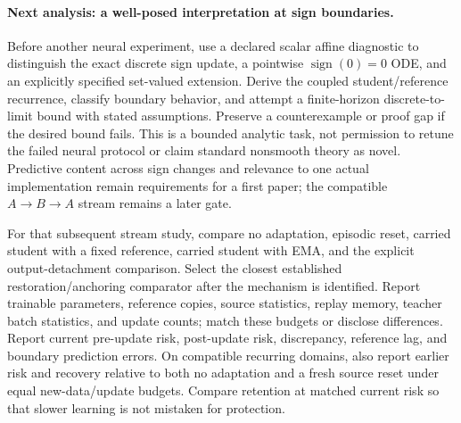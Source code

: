 \documentclass[11pt,a4paper]{article}
\begin{document}
\paragraph{Next analysis: a well-posed interpretation at sign boundaries.}
Before another neural experiment, use a declared scalar affine diagnostic
to distinguish the exact discrete sign update, a pointwise
$\operatorname{sign}(0)=0$ ODE, and an explicitly specified set-valued
extension. Derive the coupled student/reference recurrence, classify
boundary behavior, and attempt a finite-horizon discrete-to-limit bound
with stated assumptions. Preserve a counterexample or proof gap if the
desired bound fails. This is a bounded analytic task, not permission to
retune the failed neural protocol or claim standard nonsmooth theory as
novel. Predictive content across sign changes and relevance to one actual
implementation remain requirements for a first paper; the compatible
$A\to B\to A$ stream remains a later gate.

For that subsequent stream study, compare no adaptation, episodic reset,
carried student with a fixed
reference, carried student with EMA, and the explicit output-detachment
comparison. Select the closest established restoration/anchoring comparator
after the mechanism is identified. Report trainable parameters, reference
copies, source statistics, replay memory, teacher batch statistics, and
update counts; match these budgets or disclose differences. Report current
pre-update risk, post-update risk, discrepancy, reference lag, and boundary
prediction errors. On compatible recurring domains, also report earlier
risk and recovery relative to both no adaptation and a fresh source reset
under equal new-data/update budgets. Compare retention at matched current
risk so that slower learning is not mistaken for protection.
\end{document}
